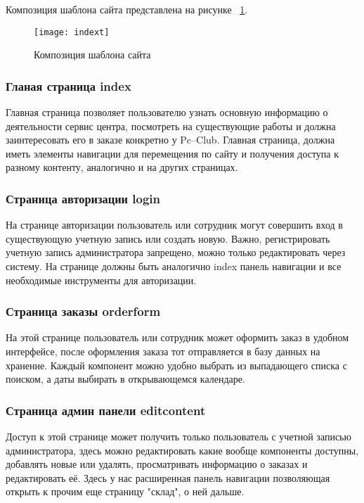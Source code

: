 Композиция шаблона сайта представлена на рисунке ~\ref{indext:image}.

\begin{figure}[ht]
\texttt{[image: indext]}
\caption{Композиция шаблона сайта}
\label{indext:image}
\end{figure}

\subsubsection{Гланая страница index}

Главная страница позволяет пользователю узнать основную информацию о деятельности сервис центра, посмотреть на существующие работы и должна заинтересовать его в заказе конкретно у Pc--Club. Главная страница, должна иметь элементы навигации для перемещения по сайту и получения доступа к разному контенту, аналогично и на других страницах.

\subsubsection{Страница авторизации login}

На странице авторизации пользователь или сотрудник могут совершить вход в существующую учетную запись или создать новую. Важно, регистрировать учетную запись администратора запрещено, можно только редактировать через систему. На странице должны быть аналогично index панель навигации и все необходимые инструменты для авторизации.

\subsubsection{Страница заказы orderform}

На этой странице пользователь или сотрудник может оформить заказ в удобном интерфейсе, после оформления заказа тот отправляется в базу данных на хранение. Каждый компонент можно удобно выбрать из выпадающего списка с поиском, а даты выбирать в открывающемся календаре.

\subsubsection{Страница админ панели editcontent}

Доступ к этой странице может получить только пользователь с учетной записью администратора, здесь можно редактировать какие вообще компоненты доступны, добавлять новые или удалять, просматривать информацию о заказах и редактировать её. Здесь у нас расширенная панель навигации позволяющая открыть к прочим еще страницу "склад", о ней дальше.

